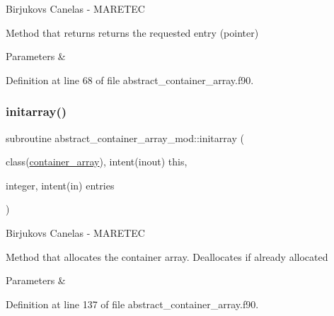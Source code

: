 Birjukovs Canelas -\/ M\+A\+R\+E\+T\+EC 

Method that returns returns the requested entry (pointer) 
\begin{DoxyParams}{Parameters}
{\em } & \\
\hline
\end{DoxyParams}


Definition at line 68 of file abstract\+\_\+container\+\_\+array.\+f90.

\mbox{\label{namespaceabstract__container__array__mod_a07b39c73368acf72d95a1dbef0f25943}} 
\subsubsection{\texorpdfstring{initarray()}{initarray()}}
{\footnotesize\ttfamily subroutine abstract\+\_\+container\+\_\+array\+\_\+mod\+::initarray (\begin{DoxyParamCaption}\item[{class(\hyperlink{structabstract__container__array__mod_1_1container__array}{container\+\_\+array}), intent(inout)}]{this,  }\item[{integer, intent(in)}]{entries }\end{DoxyParamCaption})\hspace{0.3cm}{\ttfamily [private]}}



Birjukovs Canelas -\/ M\+A\+R\+E\+T\+EC 

Method that allocates the container array. Deallocates if already allocated 
\begin{DoxyParams}{Parameters}
{\em } & \\
\hline
\end{DoxyParams}


Definition at line 137 of file abstract\+\_\+container\+\_\+array.\+f90.

\mbox{\label{namespaceabstract__container__array__mod_aae1f6309c51e282a528ce78f128443e0}} 
